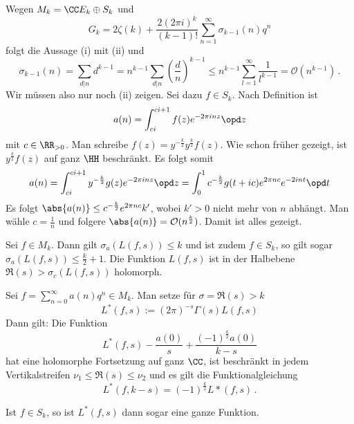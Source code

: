 \begin{bewe}
Wegen $M_k = \CC E_k \oplus S_k$ und
\[
	G_k = 2 \zeta(k) + \frac {2(2\pi i)^k}{(k-1)!} \sum_{n=1}^\infty \sigma_{k-1}(n) q^n
\]
folgt die Aussage (i) mit (ii) und
\[
	\sigma_{k-1}(n) = \sum_{d|n} d^{k-1} = n^{k-1} \sum_{d|n} \left( \frac dn \right)^{k-1} \leq n^{k-1} \sum_{l=1}^\infty \frac 1{l^{k-1}} = \mathcal O(n^{k-1})
	\,.
\]
Wir müssen also nur noch (ii) zeigen. Sei dazu $f \in S_k$. Nach Definition ist
\[
	a(n) = \int_{ci}^{ci + 1} f(z) e^{-2\pi inz} \opd z
\]
mit $c \in \RR_{>0}$. Man schreibe $f(z) = y^{- \frac k2} y^{\frac k2} f(z)$. Wie schon früher gezeigt, ist $y^{\frac k2} f(z)$ auf ganz $\HH$ beschränkt. Es folgt somit
\[
	a(n) = \int_{ci}^{ci + 1} y^{-\frac k2} g(z) e^{-2\pi inz} \opd z = \int_0^1 c^{- \frac k2} g(t+ic) e^{2\pi nc} e^{-2 int} \opd t
\]
Es folgt $\abs{a(n)} \leq c^{- \frac k2} e^{2\pi nc} k'$, wobei $k' > 0$ nicht mehr von $n$ abhängt. Man wähle $c = \frac 1n$ und folgere $\abs{a(n)} = \mathcal O(n^{\frac k2})$. Damit ist alles gezeigt.
\end{bewe}

\begin{koro}
Sei $f \in M_k$. Dann gilt $\sigma_a (L(f,s)) \leq k$ und ist zudem $f \in S_k$, so gilt sogar $\sigma_a (L(f,s)) \leq \frac k2 + 1$. Die Funktion $L(f,s)$ ist in der Halbebene $\Re(s) > \sigma_c (L(f,s))$ holomorph.
\end{koro}

\begin{satz}[Hecke]
Sei $f = \sum_{n=0}^\infty a(n) q^n \in M_k$. Man setze für $\sigma = \Re(s) > k$
\[
	L^*(f,s) := (2\pi)^{-s} \Gamma(s) L(f,s)
\]
Dann gilt: Die Funktion 
\[
	L^*(f,s) - \frac {a(0)}s + \frac {(-1)^{\frac k2} a(0)}{k-s}
\]
hat eine holomorphe Fortsetzung auf ganz $\CC$, ist beschränkt in jedem Vertikalstreifen $\nu_1 \leq \Re(s) \leq \nu_2$ und es gilt die Funktionalgleichung
\[
	L^*(f,k-s) = (-1)^{\frac k2} L*(f,s)
	\,.
\]
\end{satz}
Ist $f \in S_k$, so ist $L^*(f,s)$ dann sogar eine ganze Funktion.

